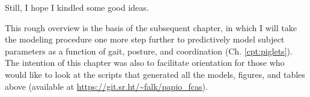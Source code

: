 Still, I hope I kindled some good ideas.
\medskip

This rough overview is the basis of the subsequent chapter, in which I will take the modeling procedure one more step further to predictively model subject parameters as a function of gait, posture, and coordination (Ch. \ref{cpt:piglets}).
The intention of this chapter was also to facilitate orientation for those who would like to look at the scripts that generated all the models, figures, and tables above (available at \url{https://git.sr.ht/~falk/papio_fcas}).


\FloatBarrier
\clearpage

\nocite{Gelman2013}

% 
% 
